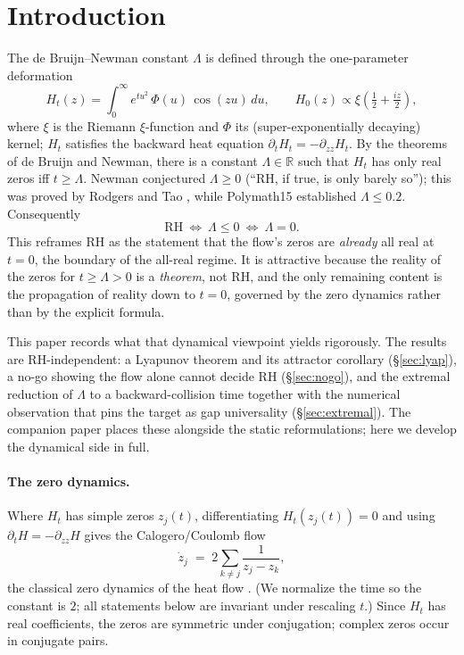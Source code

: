 \documentclass[11pt]{amsart}
\theoremstyle{definition}
\theoremstyle{remark}
\newcommand{\half}{\tfrac12}
\begin{document}
\section{Introduction}\label{sec:intro}
The de Bruijn--Newman constant $\Lambda$ is defined through the one-parameter deformation
\begin{equation}\label{eq:Ht}
H_t(z)=\int_0^\infty e^{tu^2}\,\Phi(u)\,\cos(zu)\,du,\qquad H_0(z)\propto\xi(\half+\tfrac{iz}{2}),
\end{equation}
where $\xi$ is the Riemann $\xi$-function and $\Phi$ its (super-exponentially decaying) kernel; $H_t$ satisfies
the backward heat equation $\partial_t H_t=-\partial_{zz}H_t$. By the theorems of de Bruijn and Newman, there
is a constant $\Lambda\in\mathbb R$ such that $H_t$ has only real zeros iff $t\ge\Lambda$. Newman conjectured
$\Lambda\ge0$ (``RH, if true, is only barely so''); this was proved by Rodgers and Tao \cite{RT}, while
Polymath15 \cite{P15} established $\Lambda\le0.2$. Consequently
\begin{equation}\label{eq:RHL}
\mathrm{RH}\ \Longleftrightarrow\ \Lambda\le 0\ \Longleftrightarrow\ \Lambda=0.
\end{equation}
This reframes RH as the statement that the flow's zeros are \emph{already} all real at $t=0$, the boundary of
the all-real regime. It is attractive because the reality of the zeros for $t\ge\Lambda>0$ is a \emph{theorem},
not RH, and the only remaining content is the propagation of reality down to $t=0$, governed by the zero
dynamics rather than by the explicit formula.

This paper records what that dynamical viewpoint yields rigorously. The results are RH-independent: a Lyapunov
theorem and its attractor corollary (\S\ref{sec:lyap}), a no-go showing the flow alone cannot decide RH
(\S\ref{sec:nogo}), and the extremal reduction of $\Lambda$ to a backward-collision time together with the
numerical observation that pins the target as gap universality (\S\ref{sec:extremal}). The companion paper
\cite{P11} places these alongside the static reformulations; here we develop the dynamical side in full.

\paragraph{The zero dynamics.} Where $H_t$ has simple zeros $z_j(t)$, differentiating $H_t(z_j(t))=0$ and using
$\partial_tH=-\partial_{zz}H$ gives the Calogero/Coulomb flow
\begin{equation}\label{eq:flow}
\dot z_j\;=\;2\sum_{k\ne j}\frac{1}{z_j-z_k},
\end{equation}
the classical zero dynamics of the heat flow \cite{CSV}. (We normalize the time so the constant is $2$; all
statements below are invariant under rescaling $t$.) Since $H_t$ has real coefficients, the zeros are symmetric
under conjugation; complex zeros occur in conjugate pairs.
\end{document}
